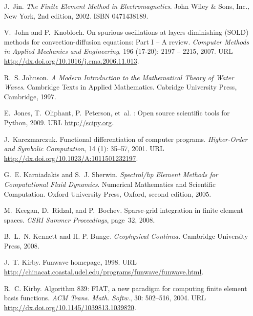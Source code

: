 \begin{thebibliography}{467}
J.~Jin.
\newblock \emph{The Finite Element Method in Electromagnetics}.
\newblock John Wiley \& Sons, Inc., New York, 2nd edition, 2002.
\newblock ISBN 0471438189.

V.~John and P.~Knobloch.
\newblock On spurious oscillations at layers diminishing ({SOLD}) methods for
  convection-diffusion equations: {P}art I -- {A} review.
\newblock \emph{Computer Methods in Applied Mechanics and Engineering},
  196 (17-20): 2197 -- 2215, 2007.
\newblock URL \url{http://dx.doi.org/10.1016/j.cma.2006.11.013}.

R.~S. Johnson.
\newblock \emph{A Modern Introduction to the Mathematical Theory of Water
  Waves}.
\newblock Cambridge Texts in Applied Mathematics. Cabridge University Press,
  Cambridge, 1997.

E.~Jones, T.~Oliphant, P.~Peterson, et~al.
: Open source scientific tools for {Python}, 2009.
\newblock URL \url{http://scipy.org}.

J.~Karczmarczuk.
\newblock Functional differentiation of computer programs.
\newblock \emph{Higher-Order and Symbolic Computation}, 14
  (1): 35--57, 2001.
\newblock URL \url{http://dx.doi.org/10.1023/A:1011501232197}.

G.~E. Karniadakis and S.~J. Sherwin.
\newblock \emph{Spectral/hp Element Methods for Computational Fluid Dynamics}.
\newblock Numerical Mathematics and Scientific Computation. Oxford University
  Press, Oxford, second edition, 2005.

M.~Keegan, D.~Ridzal, and P.~Bochev.
\newblock Sparse-grid integration in finite element spaces.
\newblock \emph{CSRI Summer Proceedings}, page~32, 2008.

B.~L.~N. Kennett and H.-P. Bunge.
\newblock \emph{Geophysical Continua}.
\newblock Cambridge University Press, 2008.

J.~T. Kirby.
\newblock Funwave homepage, 1998.
\newblock URL
  \url{http://chinacat.coastal.udel.edu/programs/funwave/funwave.html}.

R.~C. Kirby.
\newblock Algorithm 839: {FIAT}, a new paradigm for computing finite element
  basis functions.
\newblock \emph{ACM Trans. Math. Softw.}, 30: 502--516, 2004.
\newblock URL \url{http://dx.doi.org/10.1145/1039813.1039820}.


\end{thebibliography}
